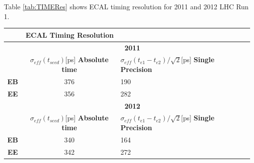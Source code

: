 Table \ref{tab:TIMERes} shows ECAL timing resolution for 2011 and 2012 LHC Run 1. 
\begin{center}
\centering
  \begin{tabular}{|cc|l|l||} %
  \hline \hline
 
 &  \multicolumn{1}{r}{\bfseries{ECAL Timing Resolution}} \\
  \hline \hline
&  \multicolumn{2}{c}{\bfseries{2011}} \\
   \hline
   & $\sigma_{eff}(t_{seed})$[ps]
        \bfseries{Absolute time}
   & $\sigma_{eff}(t_{e1} - t_{e2})/\sqrt{2}$[ps] \bfseries{Single Precision} \\ \hline
   \textbf{EB} & 376  & 190 \\
      \textbf{EE} & 356  & 282 \\
      \hline \hline
& \multicolumn{2}{c}{\bfseries{2012}}  \\
   \hline \hline
   & $\sigma_{eff}(t_{seed})$[ps]
        \bfseries{Absolute time}
   & $\sigma_{eff}(t_{e1} - t_{e2})/\sqrt{2}$[ps]   \bfseries{Single Precision} \\ \hline
   \textbf{EB} & 340  & 164 \\
      \textbf{EE} & 342  & 272 \\
      \hline \hline
 
  \end{tabular}
 \label{tab:TIMERes} %
 \end{center}



\label{ECAL Timing Calibration_chapter}
